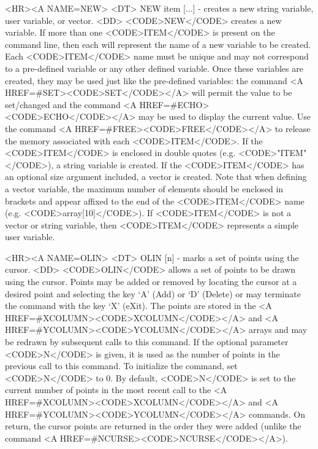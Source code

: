 \begin{rawhtml}
<HR><A NAME=NEW>
<DT>
NEW item [...] - creates a new string variable, user variable, or vector.
<DD>
	<CODE>NEW</CODE> creates a new variable.  If more than one
	<CODE>ITEM</CODE> is present on the command line, then each will
	represent the name of a new variable to be created.  Each
	<CODE>ITEM</CODE> name must be unique and may not correspond
	to a pre-defined variable or any other defined variable.  Once
	these variables are created, they may be used just like the
	pre-defined variables:  the command <A HREF=#SET><CODE>SET</CODE></A>
	will permit the value to be set/changed and the command
	<A HREF=#ECHO><CODE>ECHO</CODE></A> may be used to display the
	current value.  Use the command <A HREF=#FREE><CODE>FREE</CODE></A>
	to release the memory associated with each <CODE>ITEM</CODE>.  If
	the <CODE>ITEM</CODE> is enclosed in double quotes
	(e.g. <CODE>"ITEM"</CODE>), a string variable is created.  If the
	<CODE>ITEM</CODE> has an optional size argument included, a vector
	is created.  Note that when defining a vector variable, the
	maximum number of elements should be enclosed in brackets and
	appear affixed to the end of the <CODE>ITEM</CODE> name
	(e.g.  <CODE>array[10]</CODE>).  If <CODE>ITEM</CODE> is not a
	vector or string variable, then <CODE>ITEM</CODE> represents a
	simple user variable.

<HR><A NAME=OLIN>
<DT>
OLIN [n] - marks a set of points using the cursor.
<DD>
	<CODE>OLIN</CODE> allows a set of points to be drawn using the
	cursor.  Points may be added or removed by locating the cursor
	at a desired point and selecting the key `A' (Add) or `D' (Delete)
	or may terminate the command with the key `X' (eXit).  The points
	are stored in the <A HREF=#XCOLUMN><CODE>XCOLUMN</CODE></A> and
	<A HREF=#YCOLUMN><CODE>YCOLUMN</CODE></A> arrays and may be
	redrawn by subsequent calls to this command.  If the optional
	parameter <CODE>N</CODE> is given, it is used as the number of
	points in the previous call to this command.  To initialize the
	command, set <CODE>N</CODE> to 0.  By default, <CODE>N</CODE>
	is set to the current number of points in the most recent call
	to the <A HREF=#XCOLUMN><CODE>XCOLUMN</CODE></A>
	and <A HREF=#YCOLUMN><CODE>YCOLUMN</CODE></A> commands.  On
	return, the cursor points are returned in the order they were
	added (unlike the command <A HREF=#NCURSE><CODE>NCURSE</CODE></A>).


\end{rawhtml}
